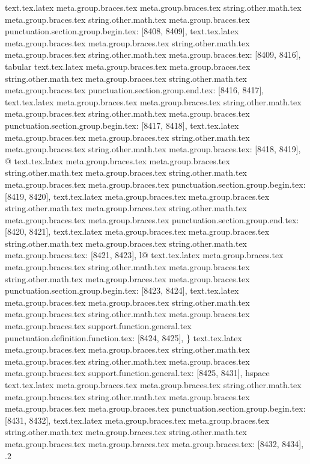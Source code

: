 {{{{{{{{{{{{{{{{{{{{{{{{{{{{{{{{{{{{{{{{{{{{{{{{{{{{{{{{{{{{{{{{{{{{{{{{{{{{{{{{{{{{{{{{{{{{{{{{{{{{{{{{{{{{{{{{{{{{{{{{{{{{{{{{{{{{{{{{{{{{{{{{{{{{{{{{{{{{{{{{{{{{{{{{{{{{{{{{{{{{{{{{{{{{{{{{{{{{{{{{{{{{{{{{{{{{{{{{{{{{{{{{{{{{{{{{{{{{{{{{{{{{{{{text.tex.latex meta.group.braces.tex meta.group.braces.tex string.other.math.tex meta.group.braces.tex string.other.math.tex meta.group.braces.tex punctuation.section.group.begin.tex: [8408, 8409], {{}
text.tex.latex meta.group.braces.tex meta.group.braces.tex string.other.math.tex meta.group.braces.tex string.other.math.tex meta.group.braces.tex: [8409, 8416], {tabular}
text.tex.latex meta.group.braces.tex meta.group.braces.tex string.other.math.tex meta.group.braces.tex string.other.math.tex meta.group.braces.tex punctuation.section.group.end.tex: [8416, 8417], {}}
text.tex.latex meta.group.braces.tex meta.group.braces.tex string.other.math.tex meta.group.braces.tex string.other.math.tex meta.group.braces.tex punctuation.section.group.begin.tex: [8417, 8418], {{}
text.tex.latex meta.group.braces.tex meta.group.braces.tex string.other.math.tex meta.group.braces.tex string.other.math.tex meta.group.braces.tex: [8418, 8419], {@}
text.tex.latex meta.group.braces.tex meta.group.braces.tex string.other.math.tex meta.group.braces.tex string.other.math.tex meta.group.braces.tex meta.group.braces.tex punctuation.section.group.begin.tex: [8419, 8420], {{}
text.tex.latex meta.group.braces.tex meta.group.braces.tex string.other.math.tex meta.group.braces.tex string.other.math.tex meta.group.braces.tex meta.group.braces.tex punctuation.section.group.end.tex: [8420, 8421], {}}
text.tex.latex meta.group.braces.tex meta.group.braces.tex string.other.math.tex meta.group.braces.tex string.other.math.tex meta.group.braces.tex: [8421, 8423], {l@}
text.tex.latex meta.group.braces.tex meta.group.braces.tex string.other.math.tex meta.group.braces.tex string.other.math.tex meta.group.braces.tex meta.group.braces.tex punctuation.section.group.begin.tex: [8423, 8424], {{}
text.tex.latex meta.group.braces.tex meta.group.braces.tex string.other.math.tex meta.group.braces.tex string.other.math.tex meta.group.braces.tex meta.group.braces.tex support.function.general.tex punctuation.definition.function.tex: [8424, 8425], {\}
text.tex.latex meta.group.braces.tex meta.group.braces.tex string.other.math.tex meta.group.braces.tex string.other.math.tex meta.group.braces.tex meta.group.braces.tex support.function.general.tex: [8425, 8431], {hspace}
text.tex.latex meta.group.braces.tex meta.group.braces.tex string.other.math.tex meta.group.braces.tex string.other.math.tex meta.group.braces.tex meta.group.braces.tex meta.group.braces.tex punctuation.section.group.begin.tex: [8431, 8432], {{}
text.tex.latex meta.group.braces.tex meta.group.braces.tex string.other.math.tex meta.group.braces.tex string.other.math.tex meta.group.braces.tex meta.group.braces.tex meta.group.braces.tex: [8432, 8434], {.2}
}}}}}}}}}}}}}}}}}}}}}}}}}}}}}}}}}}}}}}}}}}}}}}}}}}}}}}}}}}}}}}}}}}}}}}}}}}}}}}}}}}}}}}}}}}}}}}}}}}}}}}}}}}}}}}}}}}}}}}}}}}}}}}}}}}}}}}}}}}}}}}}}}}}}}}}}}}}}}}}}}}}}}}}}}}}}}}}}}}}}}}}}}}}}}}}}}}}}}}}}}}}}}}}}}}}}}}}}}}}}}}}}}}}}}}}}}}}}}}}}}}}}}}}}}}}
